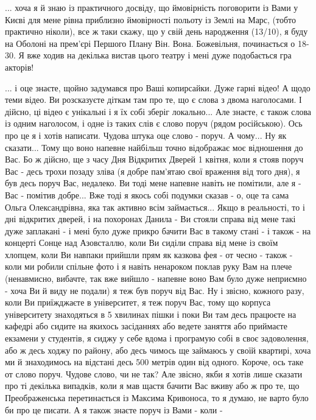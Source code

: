 ... хоча я й знаю із практичного досвіду, що ймовірність поговорити із Вами у
Києві для мене рівна приблизно ймовірності польоту із Землі на Марс, (тобто
практично ніколи), все ж таки скажу, що у свій день народження (13/10), я буду
на Оболоні на прем'єрі Першого Плану Він. Вона. Божевільня, починається о
18-30. Я вже ходив на декілька вистав цього театру і мені дуже подобається гра
акторів!

... і оце знаєте, щойно задумався про Ваші копирсайки. Дуже гарні відео!  А
щодо теми відео. Ви розсказуєте діткам там про те, що є слова з двома
наголосами. І дійсно, ці відео є унікальні і я їх собі зберіг локально... Але
знаєте, є також слова із одним наголосом, і одне із таких слів є слово поруч
(рядом російською). Ось про це я і хотів написати. Чудова штука оце слово -
поруч. А чому...  Ну як сказати... Тому що воно напевне найбільш точно
відображає моє відношення до Вас. Бо ж дійсно, ще з часу Дня Відкритих Дверей 1
квітня, коли я стояв поруч Вас - десь трохи позаду зліва (я добре пам'ятаю свої
враження від того дня), я був десь поруч Вас, недалеко. Ви тоді мене напевне
навіть не помітили, але я - Вас - помітив добре...  Вже тоді я якось собі
подумки сказав - о, оце та сама Ольга Олександрівна, яка так активно всім
займається...  Якщо в реальності, то і дні відкритих дверей, і на похоронах
Данила - Ви стояли справа від мене такі дуже заплакані - і мені було дуже
прикро бачити Вас в такому стані - і також - на концерті Сонце над Азовсталлю,
коли Ви сиділи справа від мене із своїм хлопцем, коли Ви навпаки прийшли прям
як казкова фея - от чесно - також - коли ми робили спільне фото і я навіть
ненароком поклав руку Вам на плече (ненавмисно, вибачте, так вже вийшло -
напевне воно Вам було дуже неприємно - хоча Ви й виду не подали) я теж був поруч від
Вас. Ну і звісно, кожного разу, коли Ви приїжджаєте в університет, я теж поруч
Вас, тому що корпуса університету знаходяться в 5 хвилинах пішки і поки Ви там
десь працюєте на кафедрі або сидите на якихось засіданнях або ведете заняття
або приймаєте екзамени у студентів, я сиджу у себе вдома і програмую собі в
своє задоволення, або ж десь ходжу по району, або десь чимось ще займаюсь у
своїй квартирі, хоча ми й знаходимось на відстані десь 500 метрів один від
одного.  Короче, ось таке от слово поруч. Чудове слово, чи не так? Але звісно,
якби я хотів лише сказати про ті декілька випадків, коли я мав щастя бачити Вас
вживу або ж про те, що Преображенська перетинається із Максима Кривоноса, то я
думаю, не варто було би про це писати.  А я також знаєте поруч із Вами - коли -
